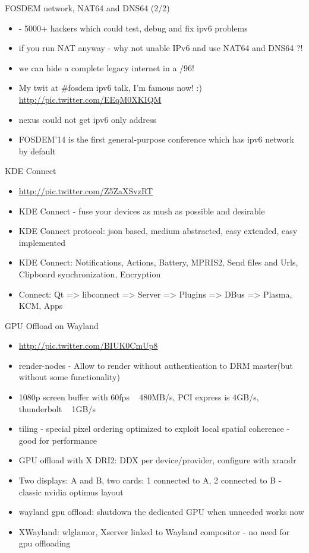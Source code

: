 \documentclass[aspectratio=169]{beamer}
\begin{document}
\begin{frame}{FOSDEM network, NAT64 and DNS64 (2/2)}
  \begin{itemize}
  \item - 5000+ hackers which could test, debug and fix ipv6 problems
  \item if you run NAT anyway - why not unable IPv6 and use NAT64 and DNS64 ?!
  \item we can hide a complete legacy internet in a /96!
  \item My twit at \#fosdem ipv6 talk, I'm famous now! :) \url{http://pic.twitter.com/EEqM0XKIQM}
  \item nexus could not get ipv6 only address
  \item FOSDEM'14 is the first general-purpose conference which has ipv6 network by default
  \end{itemize}
\end{frame}

\begin{frame}{KDE Connect}
  \begin{itemize}
  \item \url{http://pic.twitter.com/Z5ZaXSvzRT}
  \item KDE Connect - fuse your devices as mush as possible and desirable
  \item KDE Connect protocol: json based, medium abstracted, easy extended, easy implemented
  \item KDE Connect: Notifications, Actions, Battery, MPRIS2, Send files and Urls, Clipboard synchronization, Encryption
  \item Connect: Qt => libconnect => Server => Plugins => DBus => Plasma, KCM, Apps
  \end{itemize}
\end{frame}  
  
\begin{frame}{GPU Offload on Wayland}
  \begin{itemize}
  \item \url{http://pic.twitter.com/BIUK0CmUp8}
  \item render-nodes - Allow to render without authentication to DRM master(but without some functionality)
  \item 1080p screen buffer with 60fps ~ 480MB/s, PCI express is 4GB/s, thunderbolt ~ 1GB/s
  \item tiling - special pixel ordering optimized to exploit local spatial coherence - good for performance
  \item GPU offload with X DRI2: DDX per device/provider, configure with xrandr
  \item Two displays: A and B, two cards: 1 connected to A, 2 connected to B - classic nvidia optimus layout
  \item wayland gpu offload: shutdown the dedicated GPU when unneeded works now
  \item XWayland: wlglamor, Xserver linked to Wayland compositor - no need for gpu offloading
  \end{itemize}
\end{frame} 
\end{document}
